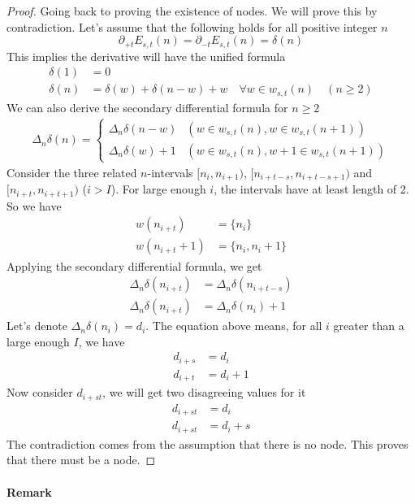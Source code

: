 \documentclass[]{article}
\begin{document}
\begin{proof}
	Going back to proving the existence of nodes. We will prove this by contradiction. Let's assume that the following holds for all positive integer $n$
	\[
	\partial_{+t}E_{s,t}(n) = \partial_{-t}E_{s,t}(n) = \delta(n)
	\]
	This implies the derivative will have the unified formula
	\begin{align*}
	\delta(1) &= 0\\
	\delta(n) &= \delta(w) + \delta(n-w) + w\quad \forall w\in w_{s,t}(n) \quad(n\geq 2)
	\end{align*}
	We can also derive the secondary differential formula for $n\geq 2$
	\begin{align*}
	\Delta_n \delta(n) =\begin{cases}
	\Delta_n  \delta(n-w) & (w\in w_{s,t}(n), w\in w_{s,t}(n+1) )\\
	\Delta_n  \delta(w) + 1 & (w\in w_{s,t}(n), w+1\in w_{s,t}(n+1) )
	\end{cases}
	\end{align*}
	Consider the three related $n$-intervals $[n_{i}, n_{i+1})$, $[n_{i + t-s}, n_{i + t-s + 1})$ and $[n_{i+t}, n_{i+t + 1})$ ($i > I$). For large enough $i$, the intervals have at least length of 2. So we have
	\begin{align*}
	w(n_{i+t}) &= \{n_{i}\}\\
	w(n_{i+t}+1) &= \{n_{i}, n_{i}+1\}
	\end{align*}
	Applying the secondary differential formula, we get
	\begin{align*}
	\Delta_n \delta(n_{i+t}) &= \Delta_n \delta(n_{i + t-s}) \\
	\Delta_n \delta(n_{i+t}) &= \Delta_n \delta(n_{i}) + 1
	\end{align*}
	Let's denote $\Delta_n \delta(n_i) = d_i$. The equation above means, for all $i$ greater than a large enough $I$, we have
	\begin{align*}
	d_{i+s} &= d_{i}\\
	d_{i+t} &= d_{i} + 1
	\end{align*}
	Now consider $d_{i+st}$, we will get two disagreeing values for it
	\begin{align*}
	d_{i+st} & = d_{i}\\
	d_{i+st} &= d_{i} + s
	\end{align*}
	The contradiction comes from the assumption that there is no node. This proves that there must be a node.
	
\end{proof}

\paragraph{Remark}
\end{document}

